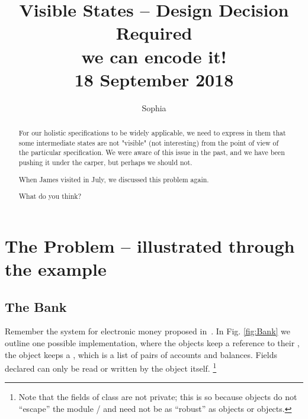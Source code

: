 \documentclass[acmsmall,screen]{acmart}
\begin{document}

\author{Sophia}
 



\title{Visible States -- Design Decision Required\\
\small{we can encode it! }
\\
\small{18 September 2018}}


\begin{abstract}

For our holistic specifications to be widely applicable, we need to express in them
 that some intermediate states
 are not "visible" (not interesting) from the point of view of the particular specification. 
We were aware of this issue in the past, and we have been pushing it under the carper, but perhaps we should not. 

When James visited in July, we discussed this problem again.
{\color{red}{In this brief document, on Monday 17.09, I outlined what the problem is, and proposed some alternative solutions.
Now I think there is a fifth solution, i.e. encode it. }}

What do you think?


\end{abstract}


\maketitle


\section{The Problem -- illustrated through the  example}
 
\subsection{The Bank} 
 
\label{s-example}
 
Remember the system for electronic money
proposed in~\cite{ELang}. In Fig. \ref{fig:Bank} we outline one possible implementation, where
the  objects keep a reference to their , the  object keeps a
, which is a list of pairs of accounts and balances. 
Fields declared   can only be read or written by the object itself. \footnote{Note that the fields of class  are not private; this is so because  objects do not ``escape'' the module / and
need not be as ``robust'' as    objects or  objects.}
\end{document}
